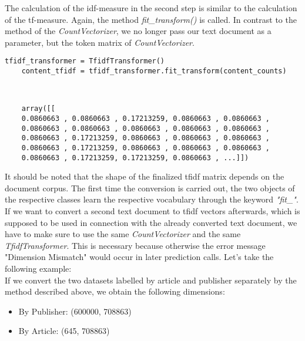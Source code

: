 \documentclass[a4paper, 11pt,titlepage,oneside,openany]{book}
\begin{document}
The calculation of the \gls{idf}-measure in the second step is similar to the calculation of the \gls{tf}-measure. Again, the method \textit{fit\_transform()} is called. In contrast to the method of the \textit{CountVectorizer}, we no longer pass our text document as a parameter, but the token matrix of \textit{CountVectorizer}. \\
\noindent
\begin{minipage}{\linewidth}
	\begin{lstlisting}[frame=single]
	tfidf_transformer = TfidfTransformer()
	content_tfidf = tfidf_transformer.fit_transform(content_counts)
	\end{lstlisting}
\end{minipage} \\
\noindent
\begin{minipage}{\linewidth}
\begin{lstlisting}
	array([[
	0.0860663 , 0.0860663 , 0.17213259, 0.0860663 , 0.0860663 ,
	0.0860663 , 0.0860663 , 0.0860663 , 0.0860663 , 0.0860663 ,
	0.0860663 , 0.17213259, 0.0860663 , 0.0860663 , 0.0860663 ,
	0.0860663 , 0.17213259, 0.0860663 , 0.0860663 , 0.0860663 ,
	0.0860663 , 0.17213259, 0.17213259, 0.0860663 , ...]])
\end{lstlisting}
\end{minipage}


\noindent It should be noted that the shape of the finalized tfidf matrix depends on the document corpus. The first time the conversion is carried out, the two objects of the respective classes learn the respective vocabulary through the keyword \textit{"fit\_"}. If we want to convert a second text document to \gls{tfidf} vectors afterwards, which is supposed to be used in connection with the already converted text document, we have to make sure to use the same \textit{CountVectorizer} and the same \textit{TfidfTransformer}. This is necessary because otherwise the error message "Dimension Mismatch" would occur in later prediction calls.
Let's take the following example: \\
\noindent If we convert the two datasets labelled by article and publisher separately by the method described above, we obtain the following dimensions:
\begin{itemize}
	\item By Publisher: (600000, 708863)
	\item By Article: (645, 708863)	
\end{itemize}
\end{document}
